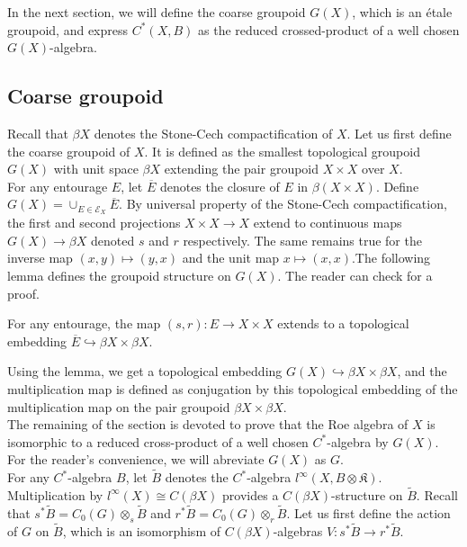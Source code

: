 In the next section, we will define the coarse groupoid $G(X)$, which is an étale groupoid, and express $C^*(X,B)$ as the reduced crossed-product of a well chosen $G(X)$-algebra.

\subsection{Coarse groupoid}

Recall that $\beta X$ denotes the Stone-Cech compactification of $X$. Let us first define the coarse groupoid of $X$. It is defined as the smallest topological groupoid $G(X)$ with unit space $\beta X$ extending the pair groupoid $X\times X$ over $X$.\\

For any entourage $E$, let $\overline E$ denotes the closure of $E$ in $\beta (X\times X)$. Define $G(X) = \cup_{E\in\mathcal E_X} \overline E$. By universal property of the Stone-Cech compactification, the first and second projections $X\times X\rightarrow X$ extend to continuous maps $G(X)\rightarrow \beta X$ denoted $s$ and $r$ respectively. The same remains true for the inverse map $(x,y)\mapsto (y,x)$ and the unit map $x\mapsto (x,x)$.The following lemma defines the groupoid structure on $G(X)$. The reader can check \cite{RoeCoarse} for a proof.

\begin{lem}\cite{RoeCoarse}
For any entourage, the map $(s,r) : E\rightarrow X\times X$ extends to a topological embedding $\overline E \hookrightarrow \beta X\times \beta X$.
\end{lem}

Using the lemma, we get a topological embedding $G(X)\hookrightarrow \beta X\times \beta X$, and the multiplication map is defined as conjugation by this topological embedding of the multiplication map on the pair groupoid $\beta X\times \beta X$.\\

The remaining of the section is devoted to prove that the Roe algebra of $X$ is isomorphic to a reduced cross-product of a well chosen $C^*$-algebra by $G(X)$. For the reader's convenience, we will abreviate $G(X)$ as $G$.\\

For any $C^*$-algebra $B$, let $\tilde B$ denotes the $C^*$-algebra $l^\infty(X,B\otimes\mathfrak K)$. Multiplication by $l^\infty(X)\cong C(\beta X)$ provides a $C(\beta X)$-structure on $\tilde B$. Recall that $s^* \tilde B = C_0(G)\otimes_s \tilde B$ and $r^* \tilde B = C_0(G)\otimes_r \tilde B$. Let us first define the action of $G$ on $\tilde B$, which is an isomorphism of $C(\beta X)$-algebras $V :s^* \tilde B\rightarrow r^* \tilde B$.\\

